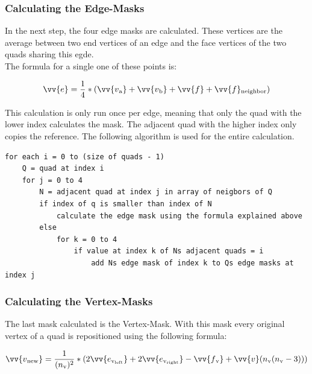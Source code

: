 \documentclass[12pt,a4paper]{scrartcl}
\begin{document}
\subsubsection{Calculating the Edge-Masks}
In the next step, the four edge masks are calculated. These vertices are the average between two end vertices of an edge and the face vertices of the two quads sharing this egde.\\
The formula for a single one of these points is:

$$ \vv{e} = \frac{1}{4} * (\vv{v\textsubscript{a}} + \vv{v\textsubscript{b}} + \vv{f} + \vv{f}\textsubscript{neighbor}) $$

This calculation is only run once per edge, meaning that only the quad with the lower index calculates the mask. The adjacent quad with the higher index only copies the reference. The following algorithm is used for the entire calculation.
\begin{lstlisting}[language=PSEUDO]
for each i = 0 to (size of quads - 1)
	Q = quad at index i
	for j = 0 to 4
		N = adjacent quad at index j in array of neigbors of Q
		if index of q is smaller than index of N
			calculate the edge mask using the formula explained above
		else
			for k = 0 to 4
				if value at index k of Ns adjacent quads = i
					add Ns edge mask of index k to Qs edge masks at index j		
\end{lstlisting} 

\subsubsection{Calculating the Vertex-Masks}
The last mask calculated is the Vertex-Mask. With this mask every original vertex of a quad is repositioned using the following formula:

$$ \vv{ v\textsubscript{new}} = \frac{1}{(n\textsubscript{v})^{2}}*(2 \vv{ e \textsubscript{v\textsubscript{left}}} + 2 \vv{ e \textsubscript{v\textsubscript{right}}} - \vv{f\textsubscript{v}} +\vv{v} (n\textsubscript{v}(n\textsubscript{v}-3))) $$
\end{document}

